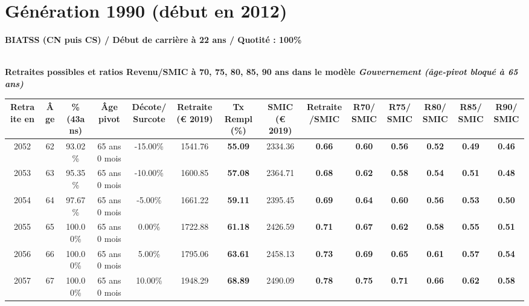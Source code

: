 \newpage 
 
\section{Génération 1990 (début en 2012)\label{BIATSS_100_1990_22_0}} 
 
{\bf \noindent BIATSS (CN puis CS) / Début de carrière à 22 ans / Quotité : 100\%}  ~ 

 ~\\{\bf \noindent Retraites possibles et ratios Revenu/SMIC à 70, 75, 80, 85, 90 ans dans le modèle \emph{Gouvernement (âge-pivot bloqué à 65 ans)}}  
 
\begin{adjustbox}{max width=\textwidth} 
\begin{tabular}[htb]{|c|c||c|c|c||c|c||c|c||c|c|c|c|c|} 
\hline 
 Retraite en &  Âge &  \%(43ans) &  Âge pivot &  Décote/Surcote &  Retraite (\euro{} 2019) &  Tx Rempl(\%) &  SMIC (\euro{} 2019) &  Retraite/SMIC &  R70/SMIC &  R75/SMIC &  R80/SMIC &  R85/SMIC &  R90/SMIC \\ 
\hline \hline 
 2052 &  62 &  93.02\% &  65 ans 0 mois &  -15.00\% &  1541.76 &  {\bf 55.09} &  2334.36 &  {\bf {\color{red} 0.66}} &  {\bf {\color{red} 0.60}} &  {\bf {\color{red} 0.56}} &  {\bf {\color{red} 0.52}} &  {\bf {\color{red} 0.49}} &  {\bf {\color{red} 0.46}} \\ 
\hline 
 2053 &  63 &  95.35\% &  65 ans 0 mois &  -10.00\% &  1600.85 &  {\bf 57.08} &  2364.71 &  {\bf {\color{red} 0.68}} &  {\bf {\color{red} 0.62}} &  {\bf {\color{red} 0.58}} &  {\bf {\color{red} 0.54}} &  {\bf {\color{red} 0.51}} &  {\bf {\color{red} 0.48}} \\ 
\hline 
 2054 &  64 &  97.67\% &  65 ans 0 mois &  -5.00\% &  1661.22 &  {\bf 59.11} &  2395.45 &  {\bf {\color{red} 0.69}} &  {\bf {\color{red} 0.64}} &  {\bf {\color{red} 0.60}} &  {\bf {\color{red} 0.56}} &  {\bf {\color{red} 0.53}} &  {\bf {\color{red} 0.50}} \\ 
\hline 
 2055 &  65 &  100.00\% &  65 ans 0 mois &  0.00\% &  1722.88 &  {\bf 61.18} &  2426.59 &  {\bf {\color{red} 0.71}} &  {\bf {\color{red} 0.67}} &  {\bf {\color{red} 0.62}} &  {\bf {\color{red} 0.58}} &  {\bf {\color{red} 0.55}} &  {\bf {\color{red} 0.51}} \\ 
\hline 
 2056 &  66 &  100.00\% &  65 ans 0 mois &  5.00\% &  1795.06 &  {\bf 63.61} &  2458.13 &  {\bf {\color{red} 0.73}} &  {\bf {\color{red} 0.69}} &  {\bf {\color{red} 0.65}} &  {\bf {\color{red} 0.61}} &  {\bf {\color{red} 0.57}} &  {\bf {\color{red} 0.54}} \\ 
\hline 
 2057 &  67 &  100.00\% &  65 ans 0 mois &  10.00\% &  1948.29 &  {\bf 68.89} &  2490.09 &  {\bf {\color{red} 0.78}} &  {\bf {\color{red} 0.75}} &  {\bf {\color{red} 0.71}} &  {\bf {\color{red} 0.66}} &  {\bf {\color{red} 0.62}} &  {\bf {\color{red} 0.58}} \\ 
\hline 
\hline 
\end{tabular} 
\end{adjustbox} 
 
